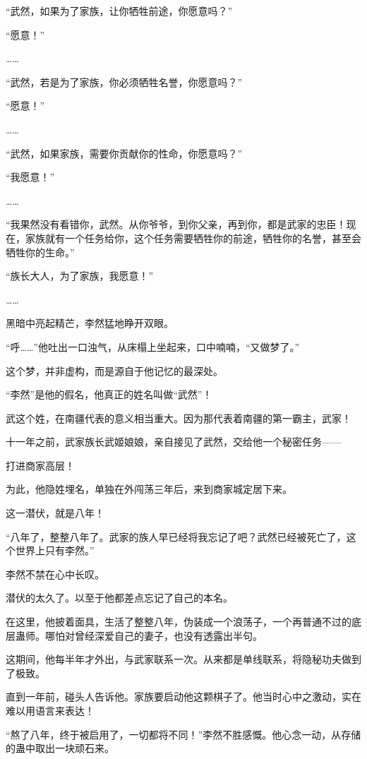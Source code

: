 
\begin{this_body}

“武然，如果为了家族，让你牺牲前途，你愿意吗？”

“愿意！”

……

“武然，若是为了家族，你必须牺牲名誉，你愿意吗？”

“愿意！”

……

“武然，如果家族，需要你贡献你的性命，你愿意吗？”

“我愿意！”

……

“我果然没有看错你，武然。从你爷爷，到你父亲，再到你，都是武家的忠臣！现在，家族就有一个任务给你，这个任务需要牺牲你的前途，牺牲你的名誉，甚至会牺牲你的生命。”

“族长大人，为了家族，我愿意！”

……

黑暗中亮起精芒，李然猛地睁开双眼。

“呼……”他吐出一口浊气，从床榻上坐起来，口中喃喃，“又做梦了。”

这个梦，并非虚构，而是源自于他记忆的最深处。

“李然”是他的假名，他真正的姓名叫做“武然”！

武这个姓，在南疆代表的意义相当重大。因为那代表着南疆的第一霸主，武家！

十一年之前，武家族长武姬娘娘，亲自接见了武然，交给他一个秘密任务——

打进商家高层！

为此，他隐姓埋名，单独在外闯荡三年后，来到商家城定居下来。

这一潜伏，就是八年！

“八年了，整整八年了。武家的族人早已经将我忘记了吧？武然已经被死亡了，这个世界上只有李然。”

李然不禁在心中长叹。

潜伏的太久了。以至于他都差点忘记了自己的本名。

在这里，他披着面具，生活了整整八年，伪装成一个浪荡子，一个再普通不过的底层蛊师。哪怕对曾经深爱自己的妻子，也没有透露出半句。

这期间，他每半年才外出，与武家联系一次。从来都是单线联系，将隐秘功夫做到了极致。

直到一年前，碰头人告诉他。家族要启动他这颗棋子了。他当时心中之激动，实在难以用语言来表达！

“熬了八年，终于被启用了，一切都将不同！”李然不胜感慨。他心念一动，从存储的蛊中取出一块顽石来。


\end{this_body}
